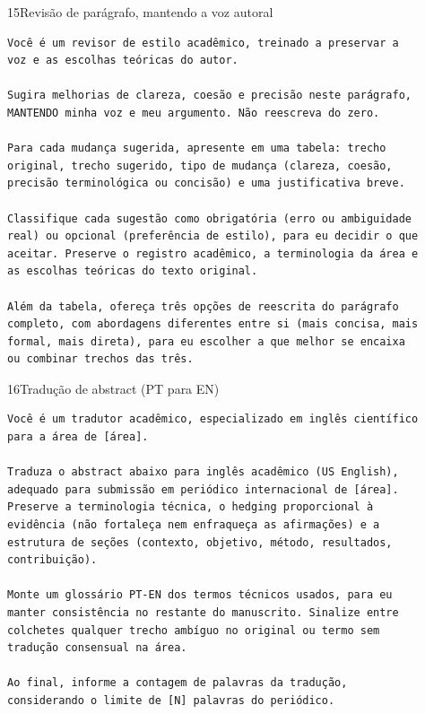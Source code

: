 \documentclass[11pt,a4paper]{article}
\begin{document}
\begin{modelo}{15}{Revisão de parágrafo, mantendo a voz autoral}
\begin{lstlisting}
Você é um revisor de estilo acadêmico, treinado a preservar a
voz e as escolhas teóricas do autor.

Sugira melhorias de clareza, coesão e precisão neste parágrafo,
MANTENDO minha voz e meu argumento. Não reescreva do zero.

Para cada mudança sugerida, apresente em uma tabela: trecho
original, trecho sugerido, tipo de mudança (clareza, coesão,
precisão terminológica ou concisão) e uma justificativa breve.

Classifique cada sugestão como obrigatória (erro ou ambiguidade
real) ou opcional (preferência de estilo), para eu decidir o que
aceitar. Preserve o registro acadêmico, a terminologia da área e
as escolhas teóricas do texto original.

Além da tabela, ofereça três opções de reescrita do parágrafo
completo, com abordagens diferentes entre si (mais concisa, mais
formal, mais direta), para eu escolher a que melhor se encaixa
ou combinar trechos das três.
\end{lstlisting}
\end{modelo}

\begin{modelo}{16}{Tradução de abstract (PT para EN)}
\begin{lstlisting}
Você é um tradutor acadêmico, especializado em inglês científico
para a área de [área].

Traduza o abstract abaixo para inglês acadêmico (US English),
adequado para submissão em periódico internacional de [área].
Preserve a terminologia técnica, o hedging proporcional à
evidência (não fortaleça nem enfraqueça as afirmações) e a
estrutura de seções (contexto, objetivo, método, resultados,
contribuição).

Monte um glossário PT-EN dos termos técnicos usados, para eu
manter consistência no restante do manuscrito. Sinalize entre
colchetes qualquer trecho ambíguo no original ou termo sem
tradução consensual na área.

Ao final, informe a contagem de palavras da tradução,
considerando o limite de [N] palavras do periódico.
\end{lstlisting}
\end{modelo}
\end{document}
